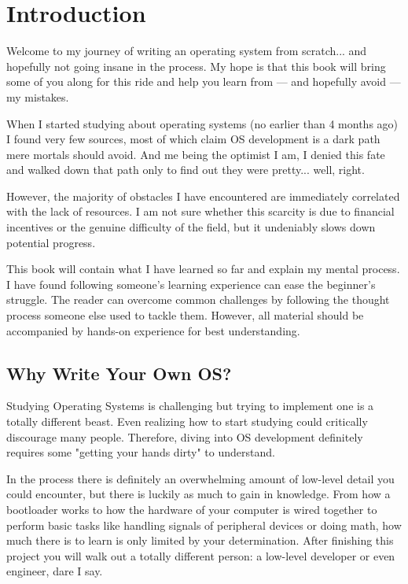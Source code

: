 \chapter{Introduction}

Welcome to my journey of writing an operating system from scratch... and hopefully not going insane in the process.
My hope is that this book will bring some of you along for this ride and help you learn from — and hopefully avoid — my mistakes. 

When I started studying about operating systems (no earlier than 4 months ago) I found very few sources, most of which
claim OS development is a dark path mere mortals should avoid.
And me being the optimist I am, I denied this fate and walked down that path only to find out they were pretty... well, right.

However, the majority of obstacles I have encountered are immediately correlated with the lack of resources.
I am not sure whether this scarcity is due to financial incentives or the genuine difficulty of the field, 
but it undeniably slows down potential progress.

This book will contain what I have learned so far and explain my mental process. I have found following someone's
learning experience can ease the beginner's struggle. The reader can overcome common challenges by following the 
thought process someone else used to tackle them. However, all material should be accompanied by
hands-on experience for best understanding.

\section{Why Write Your Own OS?}

Studying Operating Systems is challenging but trying to implement one is a totally different beast. Even realizing how to
start studying could critically discourage many people. 
Therefore, diving into OS development definitely requires some "getting your hands dirty" to understand.

In the process there is definitely an overwhelming amount of low-level detail you could encounter, 
but there is luckily as much to gain in knowledge. From how a bootloader works to how the hardware of your computer is wired
together to perform basic tasks like handling signals of peripheral devices or doing math, how much there is to learn is only 
limited by your determination. After finishing this project you will walk out a totally different person: a low-level developer
or even engineer, dare I say. 


